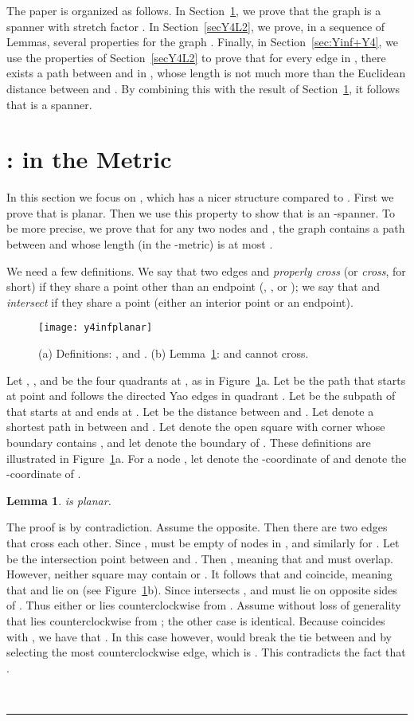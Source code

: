 \pdfoutput=1  \documentclass[11pt]{article}
\newtheorem{lemma}{Lemma}
\newcommand{\qed}{\rule{0.5em}{1.5ex}}
\newcommand{\fqed}{{\hfill~\qed}}
\newenvironment{proof}{{\noindent \bf Proof.}}
                      {{\hfill \fqed} \vspace{1em}}
\begin{document}
The paper is organized as follows.
In Section~\ref{sec:y4inf}, we prove that the graph  is a
spanner with stretch factor .
In Section~\ref{secY4L2}, we prove, in a sequence of Lemmas, several
properties for the graph . Finally, in Section~\ref{sec:Yinf+Y4},
we use the properties of Section~\ref{secY4L2} to prove that for every
edge  in , there exists a path between  and  in
, whose length is not much more than the Euclidean distance between
 and . By combining this with the result of Section~\ref{sec:y4inf},
it follows that  is a spanner.


\section{: in the  Metric}
\label{sec:y4inf}
In this section we focus on , which has a nicer structure
compared to . First we prove that  is planar. Then we
use this property to show that  is an -spanner.
To be more precise, we prove that for any two nodes  and ,
the graph  contains a path between  and  whose
length (in the -metric) is at most .

We need a few definitions.
We say that two edges  and  \emph{properly cross} (or \emph{cross},
for short) if they share a point other than an endpoint (, ,  or );
we say that  and  \emph{intersect} if they share a point (either an
interior point or an endpoint).
\begin{figure}[htbp]
\centering
\texttt{[image: y4infplanar]}
\caption{(a) Definitions: ,  and . (b) Lemma~\ref{lem:y4infplanar}:  and  cannot cross.}
\label{fig:y4infplanar}
\end{figure}
Let , ,  and  be
the four quadrants at , as in Figure~\ref{fig:y4infplanar}a.
Let  be the path that starts at point  and follows the directed
Yao edges in quadrant .
Let  be the subpath of  that starts at  and ends at .
Let  be the  distance between  and .
Let  denote a shortest path in  between  and .
Let  denote the open square with corner  whose boundary
contains , and let  denote the boundary of .
These definitions are illustrated in Figure~\ref{fig:y4infplanar}a.
For a node , let  denote the -coordinate of  and
 denote the -coordinate of .

\begin{lemma}
 is planar.
\label{lem:y4infplanar}
\end{lemma}
\begin{proof}
The proof is by contradiction. Assume the opposite. Then there are
two edges 
that cross each other. Since ,
 must be empty of nodes in , and similarly for . Let
 be the intersection point between  and .
Then , meaning that  and  must
overlap. However, neither square may contain  or . It
follows that  and  coincide, meaning that  and 
lie on  (see Figure~\ref{fig:y4infplanar}b). Since 
intersects ,  and  must lie on opposite sides of .  Thus either  or
 lies counterclockwise from . Assume without loss of generality that
 lies counterclockwise from ; the other case is identical.
Because  coincides with , we have that
. In this case however,  would break
the tie between  and  by selecting the most counterclockwise edge,
which is . This contradicts the fact that
.
\end{proof}
\end{document}
